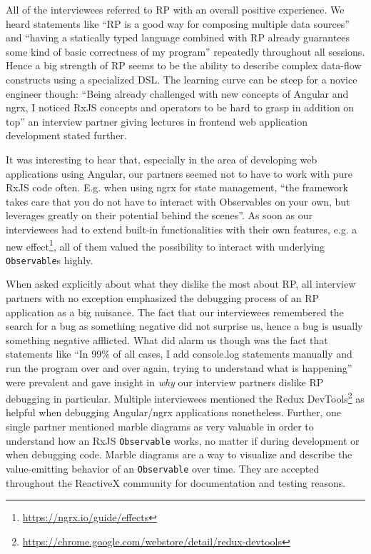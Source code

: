\documentclass[12pt,a4paper]{article}
\begin{document}
All of the interviewees referred to RP with an overall positive experience. We heard statements like ``RP is a good way for composing multiple data sources'' and ``having a statically typed language combined with RP already guarantees some kind of basic correctness of my program'' repeatedly throughout all sessions. Hence a big strength of RP seems to be the ability to describe complex data-flow constructs using a specialized DSL. The learning curve can be steep for a novice engineer though: ``Being already challenged with new concepts of Angular and ngrx, I noticed RxJS concepts and operators to be hard to grasp in addition on top'' an interview partner giving lectures in frontend web application development stated further.

It was interesting to hear that, especially in the area of developing web applications using Angular, our partners seemed not to have to work with pure RxJS code often. E.g. when using ngrx for state management, ``the framework takes care that you do not have to interact with Observables on your own, but leverages greatly on their potential behind the scenes''. As soon as our interviewees had to extend built-in functionalities with their own features, e.g. a new effect\footnote{\url{https://ngrx.io/guide/effects}}, all of them valued the possibility to interact with underlying \texttt{Observable}s highly.

When asked explicitly about what they dislike the most about RP, all interview partners with no exception emphasized the debugging process of an RP application as a big nuisance. The fact that our interviewees remembered the search for a bug as something negative did not surprise us, hence a bug is usually something negative afflicted. What did alarm us though was the fact that statements like ``In 99\% of all cases, I add console.log statements manually and run the program over and over again, trying to understand what is happening'' were prevalent and gave insight in \emph{why} our interview partners dislike RP debugging in particular. Multiple interviewees mentioned the Redux DevTools\footnote{\url{https://chrome.google.com/webstore/detail/redux-devtools}} as helpful when debugging Angular/ngrx applications nonetheless. Further, one single partner mentioned marble diagrams as very valuable in order to understand how an RxJS \texttt{Observable} works, no matter if during development or when debugging code. Marble diagrams are a way to visualize and describe the value-emitting behavior of an \texttt{Observable} over time. They are accepted throughout the ReactiveX community for documentation\cite{marblediagrams} and testing reasons\cite{marbletesting}.
\end{document}
